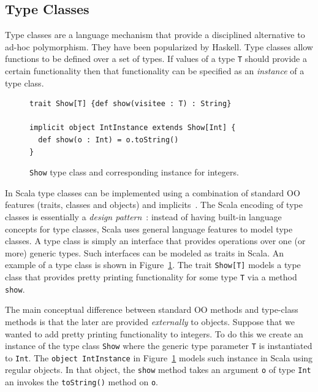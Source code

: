 \documentclass[preprint,nocopyrightspace]{sigplanconf}
\begin{document}
\subsection{Type Classes}
\label{sec:type-classes}

Type classes are a language mechanism that provide a disciplined
alternative to ad-hoc polymorphism. They have been popularized by
Haskell.  Type classes allow functions to be defined over a set of
types.  If values of a type \lstinline{T} should provide a certain
functionality then that functionality can be specified as an
\emph{instance} of a type class.

\begin{figure}
\begin{lstlisting}
trait Show[T] {def show(visitee : T) : String}

implicit object IntInstance extends Show[Int] {
  def show(o : Int) = o.toString()
}
\end{lstlisting}
\caption{\lstinline{Show} type class and corresponding instance for
  integers.}
\label{fig:showtc}
\end{figure}

In Scala type classes can be implemented using a combination of
standard OO features (traits, classes and objects) and implicits~\cite{Oliveira2010}.
The Scala encoding of type classes is essentially a \emph{design pattern}~\cite{Gamma95}:
instead of having built-in language concepts for type classes, Scala
uses general language features to model type classes.
A type class is simply an interface that provides operations
over one (or more) generic types. Such interfaces can be modeled
as traits in Scala. An example of a type class is shown in
Figure~\ref{fig:showtc}. The trait \lstinline{Show[T]} models a type
class that provides pretty printing functionality for some type
\lstinline{T} via a method \lstinline{show}.

The main conceptual difference between standard OO methods and
type-class methods is that the later are provided \emph{externally} to
objects. Suppose that we wanted to add pretty printing
functionality to integers. To do this we create an instance of
the type class \lstinline{Show} where the generic type parameter \lstinline{T} is
instantiated to \lstinline{Int}. The \lstinline{object IntInstance} in
Figure~\ref{fig:showtc} models such instance in
Scala using regular objects. In that object, the \lstinline{show}
method takes an argument \lstinline{o} of type \lstinline{Int} an
invokes the \lstinline{toString()} method on \lstinline{o}.
\end{document}
